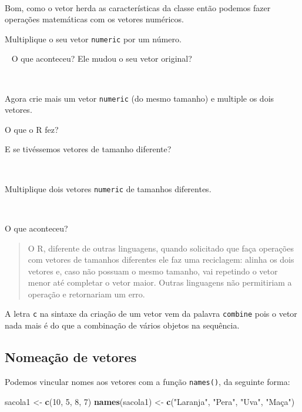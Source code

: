 \documentclass[]{book}
\newenvironment{Shaded}{\begin{snugshade}}{\end{snugshade}}
\newcommand{\DecValTok}[1]{\textcolor[rgb]{0.00,0.00,0.81}{#1}}
\newcommand{\KeywordTok}[1]{\textcolor[rgb]{0.13,0.29,0.53}{\textbf{#1}}}
\newcommand{\NormalTok}[1]{#1}
\newcommand{\StringTok}[1]{\textcolor[rgb]{0.31,0.60,0.02}{#1}}
\theoremstyle{definition}
\theoremstyle{definition}
\theoremstyle{definition}
\theoremstyle{remark}
\let\BeginKnitrBlock\begin \let\EndKnitrBlock\end
\begin{document}
~

Bom, como o vetor herda as características da classe então podemos fazer operações matemáticas com os vetores numéricos.

\BeginKnitrBlock{exercise}
\protect\hypertarget{exr:unnamed-chunk-21}{}{\label{exr:unnamed-chunk-21} }Multiplique o seu vetor \texttt{numeric} por um número.
\EndKnitrBlock{exercise}

~
O que aconteceu? Ele mudou o seu vetor original?

~
\BeginKnitrBlock{exercise}
\protect\hypertarget{exr:unnamed-chunk-22}{}{\label{exr:unnamed-chunk-22} }Agora crie mais um vetor \texttt{numeric} (do mesmo tamanho) e multiple os dois vetores.
\EndKnitrBlock{exercise}

O que o R fez?

E se tivéssemos vetores de tamanho diferente?

~
\BeginKnitrBlock{exercise}
\protect\hypertarget{exr:unnamed-chunk-23}{}{\label{exr:unnamed-chunk-23} }Multiplique dois vetores \texttt{numeric} de tamanhos diferentes.
\EndKnitrBlock{exercise}

~

O que aconteceu?

\begin{quote}
O R, diferente de outras linguagens, quando solicitado que faça operações com vetores de tamanhos diferentes ele faz uma reciclagem: alinha os dois vetores e, caso não possuam o mesmo tamanho, vai repetindo o vetor menor até completar o vetor maior. Outras linguagens não permitiriam a operação e retornariam um erro.
\end{quote}

A letra \texttt{c} na sintaxe da criação de um vetor vem da palavra \texttt{combine} pois o vetor nada mais é do que a combinação de vários objetos na sequência.

\hypertarget{nomeauxe7uxe3o-de-vetores}{%
\subsection{Nomeação de vetores}\label{nomeauxe7uxe3o-de-vetores}}

Podemos vincular nomes aos vetores com a função \texttt{names()}, da seguinte forma:

\begin{Shaded}
\begin{Highlighting}[]
\NormalTok{sacola1 <-}\StringTok{ }\KeywordTok{c}\NormalTok{(}\DecValTok{10}\NormalTok{, }\DecValTok{5}\NormalTok{, }\DecValTok{8}\NormalTok{, }\DecValTok{7}\NormalTok{)}
\KeywordTok{names}\NormalTok{(sacola1) <-}\StringTok{ }\KeywordTok{c}\NormalTok{(}\StringTok{"Laranja"}\NormalTok{, }\StringTok{"Pera"}\NormalTok{, }\StringTok{"Uva"}\NormalTok{, }\StringTok{"Maça"}\NormalTok{)}
\end{Highlighting}
\end{Shaded}
\end{document}

